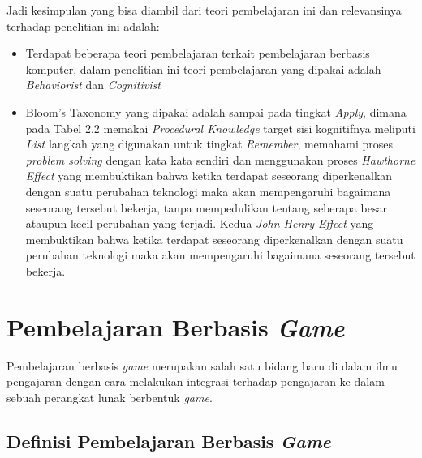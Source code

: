 	Jadi kesimpulan yang bisa diambil dari teori pembelajaran ini dan relevansinya terhadap penelitian ini adalah:
	\begin{itemize}
		\item Terdapat beberapa teori pembelajaran terkait pembelajaran berbasis komputer, dalam penelitian ini teori pembelajaran yang dipakai adalah \textit{Behaviorist} dan \textit{Cognitivist}
		\item Bloom's Taxonomy yang dipakai adalah sampai pada tingkat \textit{Apply}, dimana pada Tabel 2.2 memakai \textit{Procedural Knowledge} target sisi kognitifnya meliputi \textit{List} langkah yang digunakan untuk tingkat \textit{Remember}, memahami proses \textit{problem solving} dengan kata kata sendiri dan menggunakan proses \textit{Hawthorne Effect} yang membuktikan bahwa ketika terdapat seseorang diperkenalkan dengan suatu perubahan teknologi maka akan mempengaruhi bagaimana seseorang tersebut bekerja, tanpa mempedulikan tentang seberapa besar ataupun kecil perubahan yang terjadi. Kedua \textit{John Henry Effect} yang membuktikan bahwa ketika terdapat seseorang diperkenalkan dengan suatu perubahan teknologi maka akan mempengaruhi bagaimana seseorang tersebut bekerja.
	\end{itemize}
	
\section{Pembelajaran Berbasis \textit{Game}}
Pembelajaran berbasis \textit{game} merupakan salah satu bidang baru di dalam ilmu pengajaran dengan cara melakukan integrasi terhadap pengajaran ke dalam sebuah perangkat lunak berbentuk \textit{game}. 

	\subsection{Definisi Pembelajaran Berbasis \textit{Game}}
	
